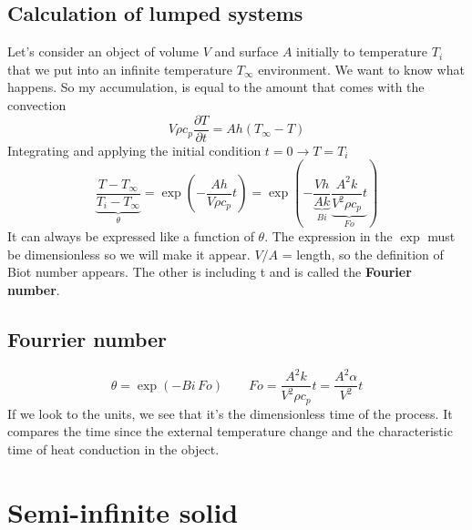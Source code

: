 	\subsection{Calculation of lumped systems}
		Let's consider an object of volume $V$ and surface $A$ initially to temperature $T_i$ that we put into an infinite temperature $T_\infty$ environment. We want to know what happens. So my accumulation, is equal to the amount that comes with the convection
		\begin{equation}
			V\rho c_p \frac{\partial T}{\partial t} = A h(T_\infty - T)
		\end{equation}
		Integrating and applying the initial condition $t = 0 \rightarrow T = T_i$
		\begin{equation}
			\underbrace{\frac{T-T_\infty}{T_i - T_\infty}}_{\theta} =
			 \exp \left( - \frac{Ah}{V\rho c_p}t \right) = 
			 \exp \left( - \underbrace{\frac{Vh}{Ak}}_{Bi} \underbrace{\frac{A^2k}{V^2\rho c_p}t}_{Fo} \right) 
		\end{equation}
It can always be expressed like a function of $\theta$. 
The expression in the $\exp$ must be dimensionless so we will make it appear. $V/A$ = length, so the definition of Biot number appears. The other is including t and is called the \textbf{Fourier number}. 

	\subsection{Fourrier number}
		\begin{equation}
			\theta = \exp (-Bi \, Fo) \qquad Fo = \frac{A^2k}{V^2 \rho c_p}t = \frac{A^2\alpha }{V^2}t
		\end{equation}
		If we look to the units, we see that it's the dimensionless time of the process. It compares the time since the external temperature change and the characteristic time of heat conduction in the object. 
		
\section{Semi-infinite solid}
